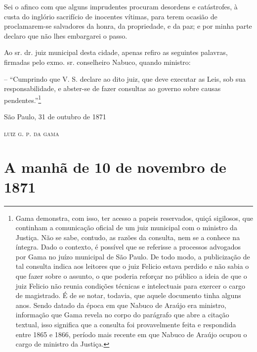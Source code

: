 Sei o afinco com que alguns imprudentes procuram desordens e
catástrofes, à custa do inglório sacrifício de inocentes vítimas, para
terem ocasião de proclamarem-se salvadores da honra, da propriedade, e
da paz; e por minha parte declaro que não lhes embargarei o passo.

Ao sr. dr. juiz municipal desta cidade, apenas refiro as seguintes
palavras, firmadas pelo exmo. sr. conselheiro Nabuco, quando ministro:

-- ``Cumprindo que V. S. declare ao dito juiz, que deve executar as Leis,
sob sua responsabilidade, e abster-se de fazer consultas ao governo
sobre causas pendentes.''\footnote{ Gama demonstra, com isso, ter acesso
  a papeis reservados, quiçá sigilosos, que continham a comunicação
  oficial de um juiz municipal com o ministro da Justiça. Não se sabe,
  contudo, as razões da consulta, nem se a conhece na íntegra. Dado o
  contexto, é possível que se referisse a processos advogados por Gama
  no juízo municipal de São Paulo. De todo modo, a publicização de tal
  consulta indica aos leitores que o juiz Felicio estava perdido e não
  sabia o que fazer sobre o assunto, o que poderia reforçar no público a
  ideia de que o juiz Felicio não reunia condições técnicas e
  intelectuais para exercer o cargo de magistrado. É de se notar,
  todavia, que aquele documento tinha alguns anos. Sendo datado da época
  em que Nabuco de Araújo era ministro, informação que Gama revela no
  corpo do parágrafo que abre a citação textual, isso significa que a
  consulta foi provavelmente feita e respondida entre 1865 e 1866,
  período mais recente em que Nabuco de Araújo ocupou o cargo de
  ministro da Justiça.}

\begin{flushright}
São Paulo, 31 de outubro de 1871

\textsc{luiz g. p. da gama}
\end{flushright}

\part{A manhã de 10 de novembro de 1871}

